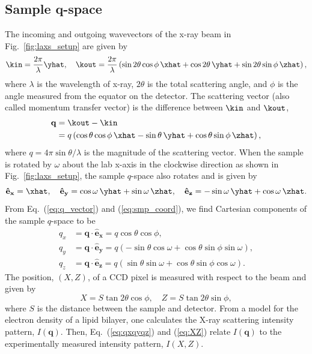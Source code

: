 \subsection{Sample q-space}\label{sec:sample_q-space}
The incoming and outgoing wavevectors of the x-ray beam in Fig.~\ref{fig:laxs_setup}
are given by
\begin{equation}
  \kin = \frac{2\pi}{\lambda} \yhat, \quad
  \kout = 
    \frac{2\pi}{\lambda} \left( 
      \sin 2\theta \cos\phi \, \xhat
      + \cos 2\theta \, \yhat
      + \sin 2\theta \sin\phi \, \zhat 
    \right),
\end{equation}
where $\lambda$ is the wavelength of x-ray, $2\theta$ is the total scattering
angle, and $\phi$ is the angle measured from the equator on the detector. 
The scattering vector (also called
momentum transfer vector) is
the difference between $\kin$ and $\kout$,
\begin{align}
  \mathbf{q} &= \kout - \kin \nonumber \\
             &= q \left( 
                  \cos\theta\cos\phi \, \xhat - \sin\theta \, \yhat
                  + \cos\theta\sin\phi \, \zhat
                \right),
  \label{eq:q_vector}
\end{align}
where $q=4\pi\sin\theta/\lambda$ is the magnitude of the scattering vector. 
When the sample is rotated by $\omega$ about the lab x-axis in the clockwise 
direction as shown in Fig.~\ref{fig:laxs_setup}, the sample $q$-space also 
rotates and 
is given by  
\begin{equation}
  \mathbf{\hat{e}_x} = \xhat, \quad
  \mathbf{\hat{e}_y} = \cos\omega\,\yhat + \sin\omega\,\zhat, \quad
  \mathbf{\hat{e}_z} = -\sin\omega\,\yhat + \cos\omega\,\zhat.
  \label{eq:smp_coord}
\end{equation}
From Eq.~(\ref{eq:q_vector}) and (\ref{eq:smp_coord}), we find Cartesian
components of the sample $q$-space to be
\begin{align}
  q_x &= \mathbf{q}\cdot\mathbf{\hat{e}_x} 
       = q\cos\theta\cos\phi, 
       \nonumber\\
  q_y &= \mathbf{q}\cdot\mathbf{\hat{e}_y} 
       = q\left(-\sin\theta\cos\omega + \cos\theta\sin\phi\sin\omega\right), 
       \nonumber\\
  q_z &= \mathbf{q}\cdot\mathbf{\hat{e}_z} 
       = q\left(\sin\theta\sin\omega + \cos\theta\sin\phi\cos\omega\right).
       \label{eq:qxqyqz}
\end{align}
The position, $(X,Z)$, of a CCD pixel is measured with respect to the beam 
and given by
\begin{equation}
  X = S \tan 2\theta \cos\phi, \quad Z = S \tan 2\theta \sin\phi,
  \label{eq:XZ}
\end{equation} 
where $S$ is the distance between the sample and detector.
From a model for the electron density of a lipid bilayer, one calculates
the X-ray scattering intensity pattern, $I(\mathbf{q})$. Then, Eq.~(\ref{eq:qxqyqz})
and (\ref{eq:XZ}) relate $I(\mathbf{q})$ to the experimentally measured
intensity pattern, $I(X,Z)$. 

